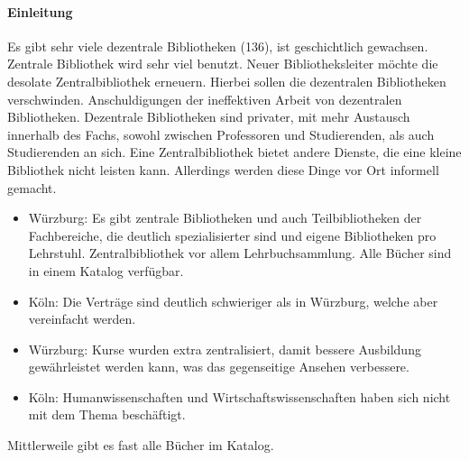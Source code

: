     \paragraph{Einleitung}
      Es gibt sehr viele dezentrale Bibliotheken (136), ist geschichtlich gewachsen.
      Zentrale Bibliothek wird sehr viel benutzt.
      Neuer Bibliotheksleiter möchte die desolate Zentralbibliothek erneuern. Hierbei sollen die dezentralen Bibliotheken verschwinden. Anschuldigungen der ineffektiven Arbeit von dezentralen Bibliotheken.
      Dezentrale Bibliotheken sind privater, mit mehr Austausch innerhalb des Fachs, sowohl zwischen Professoren und Studierenden, als auch Studierenden an sich.
      Eine Zentralbibliothek bietet andere Dienste, die eine kleine Bibliothek nicht leisten kann. Allerdings werden diese Dinge vor Ort informell gemacht.

    \begin{itemize}
      \item Würzburg: Es gibt zentrale Bibliotheken und auch Teilbibliotheken der Fachbereiche, die deutlich spezialisierter sind und eigene Bibliotheken pro Lehrstuhl. Zentralbibliothek vor allem Lehrbuchsammlung. Alle Bücher sind in einem Katalog verfügbar.

      \item Köln: Die Verträge sind deutlich schwieriger als in Würzburg, welche aber vereinfacht werden.

      \item Würzburg: Kurse wurden extra zentralisiert, damit bessere Ausbildung gewährleistet werden kann, was das gegenseitige Ansehen verbessere.

      \item Köln: Humanwissenschaften und Wirtschaftswissenschaften haben sich nicht mit dem Thema beschäftigt.
    \end{itemize}

      Mittlerweile gibt es fast alle Bücher im Katalog.

